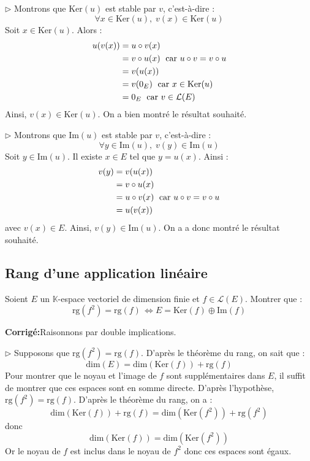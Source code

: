 \documentclass[a4paper,twoside,french,11pt]{VcCours}
\newcommand{\corr}{\textbf{Corrigé:}}
\begin{document}
\noindent $\rhd$ Montrons que $\textrm{Ker}(u)$ est stable par $v$, c'est-à-dire :
$$ \forall x \in \textrm{Ker}(u), \; v(x) \in \textrm{Ker}(u)$$
Soit $x \in \textrm{Ker}(u)$. Alors :
\begin{align*}
u (v(x)) & = u \circ v (x) \\
& = v \circ u (x) \; \hbox{ car } u \circ v = v \circ u \\
& = v(u(x)) \\
& = v(0_E) \; \hbox{ car } x \in \textrm{Ker}(u) \\
& = 0_E \; \hbox{ car } v \in \mathcal{L}(E)
\end{align*}
Ainsi, $v(x) \in \textrm{Ker}(u)$. On a bien montré le résultat souhaité.



\noindent $\rhd$ Montrons que $\textrm{Im}(u)$ est stable par $v$, c'est-à-dire :
$$ \forall y \in \textrm{Im}(u), \; v(y) \in \textrm{Im}(u)$$
Soit $y \in \textrm{Im}(u)$. Il existe $x \in E$ tel que $y = u(x)$. Ainsi :
\begin{align*}
v(y) & = v (u(x)) \\
& = v \circ u(x) \\
& = u \circ v(x) \; \hbox{ car } u \circ v = v \circ u \\
& = u (v(x)) 
\end{align*}
avec $v(x) \in E$. Ainsi, $v(y) \in \textrm{Im}(u)$. On a a donc montré le résultat souhaité.





\subsection{\large Rang d'une application linéaire}




\begin{Exercice}{} Soient $E$ un $\mathbb{K}$-espace vectoriel de dimension finie et $f \in \mathcal{L}(E)$. Montrer que :
$$ \textrm{rg}(f^2 ) =  \textrm{rg}( f ) \, \Longleftrightarrow E = \textrm{Ker}(f) \oplus \textrm{Im}(f) $$
\end{Exercice}

\corr Raisonnons par double implications.



\noindent $\rhd$ Supposons que $\textrm{rg}(f^2 ) =  \textrm{rg}( f )$. D'après le théorème du rang, on sait que :
$$ \textrm{dim}(E) = \textrm{dim}( \textrm{Ker}(f)) + \textrm{rg}( f )$$
Pour montrer que le noyau et l'image de $f$ sont supplémentaires dans $E$, il suffit de montrer que ces espaces sont en somme directe. D'après l'hypothèse, $\textrm{rg}(f^2 ) =  \textrm{rg}( f )$. D'après le théorème du rang, on a :
$$ \textrm{dim}( \textrm{Ker}(f)) + \textrm{rg}( f ) = \textrm{dim}( \textrm{Ker}(f^2)) + \textrm{rg}( f^2)$$
donc 
$$ \textrm{dim}( \textrm{Ker}(f)) = \textrm{dim}( \textrm{Ker}(f^2))$$
Or le noyau de $f$ est inclus dans le noyau de $f^2$ donc ces espaces sont égaux.
\end{document}
